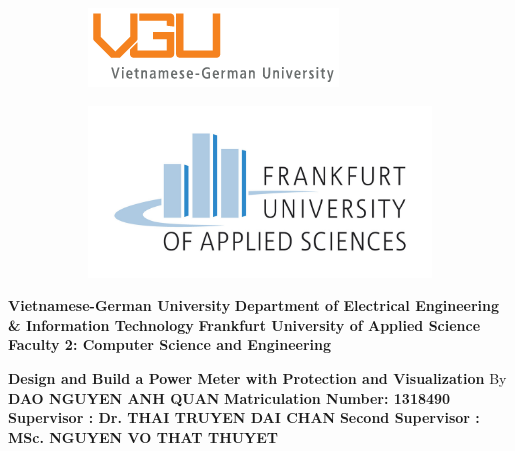 \documentclass[main.tex]{subfiles}
\begin{document}
    \begin{figure}[!h]
        \hspace{-2.0cm}
        \begin{subfigure}{0.5\textwidth}
        \includegraphics[left, scale=0.9]{media/vgu_logo.png} 
        \end{subfigure}
        \hspace{6.0cm}
        \begin{subfigure}{0.5\textwidth}
        \includegraphics[right, scale=0.6]{media/FRA-UAS_Logo_rgb.jpg}
        \end{subfigure}
    \end{figure}

    \vspace{5mm}
    \center
    \textbf{Vietnamese-German University}
    \center
    \textbf{Department of Electrical Engineering \& Information Technology}
    \vspace{3mm}
    \center
    \textbf{Frankfurt University of Applied Science}
    \center
    \textbf{Faculty 2: Computer Science and Engineering}

    \vspace{2cm}
    \center
    \hspace{-1cm}
    {\Large\textbf{Design and Build a Power Meter with Protection and Visualization}} 
    \hspace{1cm}
    \center
    By
    \center
    {\large\textbf{DAO NGUYEN ANH QUAN}} 
    \center
    \textbf{Matriculation Number: 1318490}
    \center  
    \vspace{5mm}
    {\large\textbf{Supervisor : Dr. THAI TRUYEN DAI CHAN}} 
    \center
    {\large\textbf{Second Supervisor : MSc. NGUYEN VO THAT THUYET}} 
\end{document}
